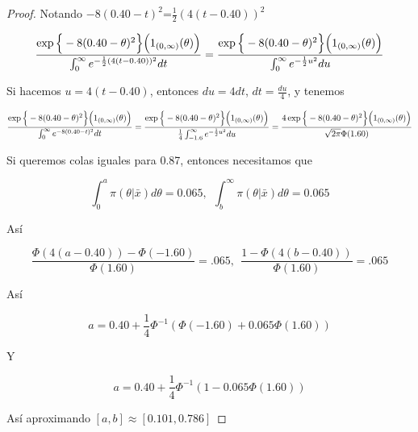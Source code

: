 \documentclass[11pt,letterpaper]{article}
\begin{document}
\begin{proof}
    Notando $-8(0.40-t)^2$=$\frac{1}{2}(4(t-0.40))^2$

    \begin{equation*}
        \frac{\exp\Big{\{}-8(0.40-\theta)^2\Big{\}}\Big{(}1_{(0,\infty)}(\theta)\Big{)}}{\int_0^{\infty}e^{-\frac{1}{2}(4(t-0.40))^2}dt}=\frac{\exp\Big{\{}-8(0.40-\theta)^2\Big{\}}\Big{(}1_{(0,\infty)}(\theta)\Big{)}}{\int_0^{\infty}e^{-\frac{1}{2}u^2}du}
    \end{equation*}

    Si hacemos $u=4(t-0.40)$, entonces $du=4dt$, $dt=\frac{du}{4}$, y tenemos

    \begin{equation*}
        \frac{\exp\Big{\{}-8(0.40-\theta)^2\Big{\}}\Big{(}1_{(0,\infty)}(\theta)\Big{)}}{\int_0^{\infty}e^{-8(0.40-t)^2}dt}=\frac{\exp\Big{\{}-8(0.40-\theta)^2\Big{\}}\Big{(}1_{(0,\infty)}(\theta)\Big{)}}{\frac{1}{4}\int_{-1.6}^{\infty}e^{-\frac{1}{2}u^2}du}=\frac{4\exp\Big{\{}-8(0.40-\theta)^2\Big{\}}\Big{(}1_{(0,\infty)}(\theta)\Big{)}}{\sqrt{2\pi}\Phi(1.60)}
    \end{equation*}

    Si queremos colas iguales para 0.87, entonces necesitamos que

    \begin{equation*}
        \int_0^{a}\pi(\theta|\bar{x})d\theta=0.065, \ \ \int_b^{\infty}\pi(\theta|\bar{x})d\theta=0.065
    \end{equation*}

    Así

    \begin{equation*}
        \frac{\Phi(4(a-0.40))-\Phi(-1.60)}{\Phi(1.60)}=.065, \ \ \frac{1-\Phi(4(b-0.40))}{\Phi(1.60)}=.065
    \end{equation*}

    Así

    \begin{equation*}
        a=0.40+\frac{1}{4}\Phi^{-1}(\Phi(-1.60)+0.065\Phi(1.60))
    \end{equation*}

    Y

    \begin{equation*}
        a=0.40+\frac{1}{4}\Phi^{-1}(1-0.065\Phi(1.60))
    \end{equation*}

    Así aproximando $[a,b]\approx[0.101,0.786]$
\end{proof}\,
\end{document}
